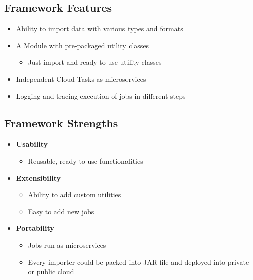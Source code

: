 \subsection{Framework Features}\label{framework-features}

\begin{itemize}
\tightlist
\item
  Ability to import data with various types and formats
\item
  A Module with pre-packaged utility classes

  \begin{itemize}
  \tightlist
  \item
    Just import and ready to use utility classes
  \end{itemize}
\item
  Independent Cloud Tasks as microservices
\item
  Logging and tracing execution of jobs in different steps
\end{itemize}

\subsection{Framework Strengths}\label{framework-strengths}

\begin{itemize}
\tightlist
\item
  \textbf{Usability}

  \begin{itemize}
  \tightlist
  \item
    Reusable, ready-to-use functionalities
  \end{itemize}
\item
  \textbf{Extensibility}

  \begin{itemize}
  \tightlist
  \item
    Ability to add custom utilities
  \item
    Easy to add new jobs
  \end{itemize}
\item
  \textbf{Portability}

  \begin{itemize}
  \tightlist
  \item
    Jobs run as microservices
  \item
    Every importer could be packed into JAR file and deployed into
    private or public cloud
  \end{itemize}
\end{itemize}

